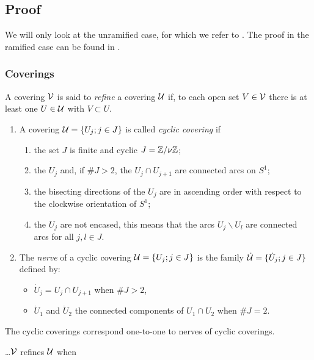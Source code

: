 \subsection{Proof}
We will only look at the unramified case, for which we refer to
\cite[Sec.II.3]{Loday1994}.
The proof in the ramified case can be found in \cite[Sec.II.4]{Loday1994}.

\subsubsection{Coverings}
\begin{comment}
  \cite[Sec.II.1]{Loday1994} and \cite[Sec.II.3.1]{Loday1994}
\end{comment}
A covering $\mathcal{V}$ is said to \emph{refine} a covering $\mathcal{U}$ if, to each open set
$V\in\mathcal{V}$ there is at least one $U\in\mathcal{U}$ with $V\subset U$.
\begin{defn}
  \begin{enumerate}
    \item A covering $\mathcal{U}=\{U_j;j\in J\}$ is called \emph{cyclic covering} if
      \begin{enumerate}
        \item the set $J$ is finite and cyclic $J=\mathbb{Z}/\nu\mathbb{Z}$;
        \item the $U_j$ and, if $\#J>2$, the $U_j\cap U_{j+1}$ are connected
          arcs on $S^1$;
        \item the bisecting directions of the $U_j$ are in ascending order with
          respect to the clockwise orientation of $S^1$;
        \item the $U_j$ are not encased, this means that the arcs
          $U_j\backslash U_l$ are connected arcs for all $j,l\in J$.
      \end{enumerate}
    \item The \emph{nerve} of a cyclic covering $\mathcal{U}=\{U_j;j\in J\}$ is the
      family $\dot{\mathcal{U}}=\{\dot U_j;j\in J\}$ defined by:
      \begin{itemize}
        \item $\dot U_j=U_j\cap U_{j+1}$ when $\#J>2$,
        \item $\dot U_1$ and $\dot U_2$ the connected components of
          $U_1\cap U_2$ when $\#J=2$.
      \end{itemize}
  \end{enumerate}
\end{defn}
The cyclic coverings correspond one-to-one to nerves of cyclic coverings.
\begin{prop}
  \dots $\mathcal{V}$ refines $\mathcal{U}$ when \TODO{}
\end{prop}

